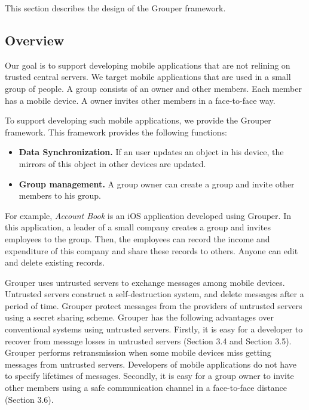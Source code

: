 \documentclass[twocolumn,10pt]{article}
\begin{document}
This section describes the design of the Grouper framework.

\subsection{Overview}

Our goal is to support developing mobile applications that are not relining on trusted central servers.
We target mobile applications that are used in a small group of people.
A group consists of an owner and other members.
Each member has a mobile device.
A owner invites other members in a face-to-face way.

To support developing such mobile applications, we provide the Grouper framework.
This framework provides the following functions:

\begin{itemize}
	\setlength{\itemsep}{1pt}
	\setlength{\parskip}{0pt}
	\setlength{\parsep}{0pt}
	\item \textbf{Data Synchronization.} If an user updates an object in his device, the mirrors of this object in other devices are updated.
	\item \textbf{Group management.} A group owner can create a group and invite other members to his group.
\end{itemize}

For example, \emph{Account Book} is an iOS application developed using Grouper. 
In this application, a leader of a small company creates a group and invites employees to the group. 
Then, the employees can record the income and expenditure of this company and share these records to others.
Anyone can edit and delete existing records.

Grouper uses untrusted servers to exchange messages among mobile devices.
Untrusted servers construct a self-destruction system, and delete messages after a period of time.
Grouper protect messages from the providers of untrusted servers using a secret sharing scheme.
Grouper has the following advantages over conventional systems using untrusted servers.
Firstly, it is easy for a developer to recover from message losses in untrusted servers (Section 3.4 and Section 3.5).
Grouper performs retransmission when some mobile devices miss getting messages from untrusted servers.
Developers of mobile applications do not have to specify lifetimes of messages.
Secondly, it is easy for a group owner to invite other members using a safe communication channel in a face-to-face distance (Section 3.6).
\end{document}
